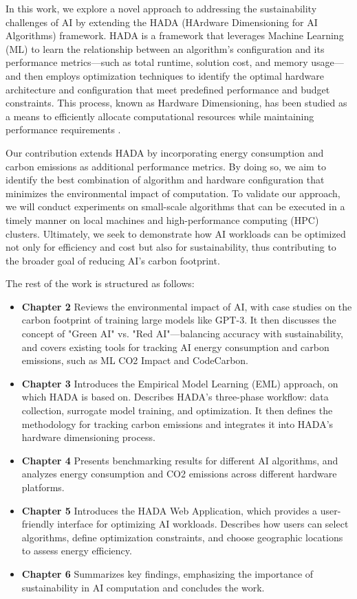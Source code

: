 \documentclass[a4paper,singleside,12pt]{report} %
\begin{document}
In this work, we explore a novel approach to addressing the sustainability challenges of AI by extending the HADA (HArdware 
Dimensioning for AI Algorithms) framework. HADA is a framework that leverages Machine Learning (ML) to learn the relationship 
between an algorithm's configuration and its performance metrics—such as total runtime, solution cost, and memory usage—and then 
employs optimization techniques to identify the optimal hardware architecture and configuration that meet predefined performance 
and budget constraints. This process, known as Hardware Dimensioning, has been studied as a means to efficiently allocate 
computational resources while maintaining performance requirements \cite{DEFILIPPO2022109199}. 

Our contribution extends HADA by incorporating energy consumption and carbon emissions as additional performance metrics. 
By doing so, we aim to identify the best combination of algorithm and hardware configuration that minimizes the environmental 
impact of computation. To validate our approach, we will conduct experiments on small-scale algorithms that can be executed in 
a timely manner on local machines and high-performance computing (HPC) clusters. Ultimately, we seek to demonstrate how AI 
workloads can be optimized not only for efficiency and cost but also for sustainability, thus contributing to the broader goal 
of reducing AI's carbon footprint.


The rest of the work is structured as follows:
\begin{itemize}
    \item \textbf{Chapter 2} Reviews the environmental impact of AI, with case studies on the carbon footprint of training large models like GPT-3. It then discusses the concept of "Green AI" vs. "Red AI"—balancing accuracy with sustainability, and covers existing tools for tracking AI energy consumption and carbon emissions, such as ML CO2 Impact and CodeCarbon.
    \item \textbf{Chapter 3} Introduces the Empirical Model Learning (EML) approach, on which HADA is based on. Describes HADA's three-phase workflow: data collection, surrogate model training, and optimization. It then defines the methodology for tracking carbon emissions and integrates it into HADA’s hardware dimensioning process.
    \item \textbf{Chapter 4} Presents benchmarking results for different AI algorithms, and analyzes energy consumption and CO2 emissions across different hardware platforms.
    \item \textbf{Chapter 5} Introduces the HADA Web Application, which provides a user-friendly interface for optimizing AI workloads. Describes how users can select algorithms, define optimization constraints, and choose geographic locations to assess energy efficiency.
    \item \textbf{Chapter 6} Summarizes key findings, emphasizing the importance of sustainability in AI computation and concludes the work.
\end{itemize}
\end{document}
